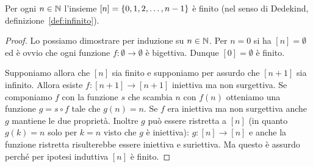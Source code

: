 \begin{lemma}\label{lm:nfinito}
Per ogni $n\in {\mathbb N}$ l'insieme $[n]={\left\{ 0,1,2, \dots, n-1 \right\}}$ è 
finito (nel senso di Dedekind, definizione~\ref{def:infinito}).
\end{lemma}
%
\begin{proof}
Lo possiamo dimostrare per induzione su $n\in {\mathbb N}$.
Per $n=0$ si ha $[n]=\emptyset$ ed è ovvio che ogni funzione 
$f\colon \emptyset \to \emptyset$ è bigettiva. 
Dunque $[0]=\emptyset$ è finito.

Supponiamo allora che $[n]$ sia finito e supponiamo per assurdo che $[n+1]$ sia 
infinito.
Allora esiste $f\colon [n+1]\to[n+1]$ iniettiva ma non surgettiva. 
Se componiamo $f$ con la funzione $s$ che scambia $n$ con $f(n)$ otteniamo 
una funzione $g = s\circ f$ tale che $g(n)=n$.
Se $f$ era iniettiva ma non surgettiva anche $g$ mantiene le due proprietà.
Inoltre $g$ può essere ristretta a $[n]$ (in quanto $g(k)=n$ solo per $k=n$ 
visto che $g$ è iniettiva): $g\colon [n]\to [n]$
e anche la funzione ristretta risulterebbe essere iniettiva e suriettiva.
Ma questo è assurdo perché per ipotesi induttiva $[n]$ è finito.
\end{proof}

